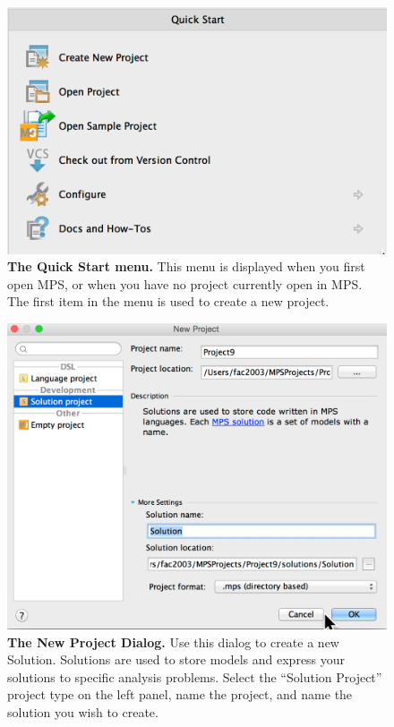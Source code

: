 \begin{figure}
  \includegraphics[width=\figWidthNarrow]{figures/QuickStart.png}
  \caption[The Quick Start menu.]{\textbf{The Quick Start menu.} This menu is displayed when you first open MPS, or when you have no project currently open in MPS. The first item in the menu is used to create a new project. 
}\label{fig:QuickStartMenu}
\end{figure}

\begin{figure}
  \includegraphics[width=\figWidthNarrow]{figures/NewSolutionWizard.png}
  \caption[The New Project Dialog.]{\textbf{The New Project Dialog.} Use this dialog to create a new Solution. Solutions are used to store models and express your solutions to specific analysis problems. Select the ``Solution Project'' project type on the left panel, name the project, and name the solution you wish to create.
}\label{fig:NewProjectDialog}
\end{figure}
